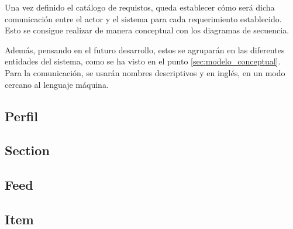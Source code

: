 Una vez definido el catálogo de requistos, queda establecer cómo será dicha comunicación entre el actor y el sistema para cada requerimiento establecido. Esto se consigue realizar de manera conceptual con los diagramas de secuencia.

Además, pensando en el futuro desarrollo, estos se agruparán en las diferentes entidades del sistema, como se ha visto en el punto \ref{sec:modelo_conceptual}. Para la comunicación, se usarán nombres descriptivos y en inglés, en un modo cercano al lenguaje máquina.

\subsection{Perfil}

\subsection{Section}

\subsection{Feed}

\subsection{Item}